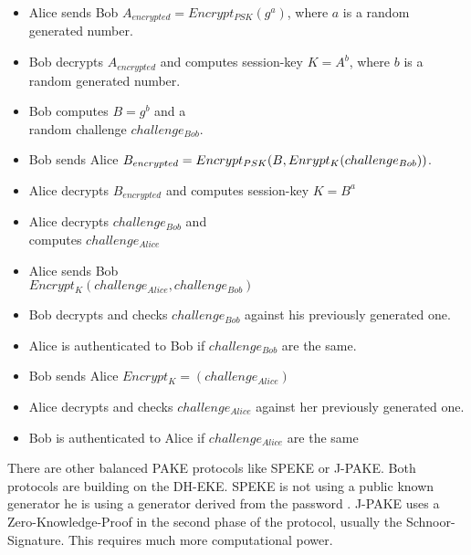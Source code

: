 \documentclass[journal]{IEEEtran}
\begin{document}
    \begin{itemize}[]
        \item Alice sends Bob $A_{encrypted} = Encrypt_{PSK}(g^a)$, where $a$ is a random generated number.
        \item Bob decrypts $A_{encrypted}$ and computes session-key $K=A^b$, where $b$ is a random generated number.
        \item Bob computes $B=g^b$ and a \\
         random challenge $challenge_{Bob}$.
        \item Bob sends Alice $B_{encrypted} = \\
        Encrypt_{PSK}(B, Enrypt_{K}(challenge_{Bob}))$.
        \item Alice decrypts $B_{encrypted}$ and computes session-key $K=B^a$
        \item Alice decrypts $challenge_{Bob}$ and \\ 
        computes $challenge_{Alice}$
        \item Alice sends Bob \\
        $Encrypt_{K}(challenge_{Alice}, challenge_{Bob})$
        \item Bob decrypts and checks $challenge_{Bob}$ against his previously generated one.
        \item Alice is authenticated to Bob if $challenge_{Bob}$ are the same.
        \item Bob sends Alice $Encrypt_{K} = (challenge_{Alice})$
        \item Alice decrypts and checks $challenge_{Alice}$ against her previously generated one.
        \item Bob is authenticated to Alice if $challenge_{Alice}$ are the same 
    \end{itemize}
    There are other balanced PAKE protocols like SPEKE or J-PAKE.
    Both protocols are building on the DH-EKE.
    SPEKE is not using a public known generator he is using a generator derived from the password \cite{hao2014speke}.
    J-PAKE uses a Zero-Knowledge-Proof in the second phase of the protocol, usually the Schnoor-Signature. This requires much more computational power. 
\end{document}
